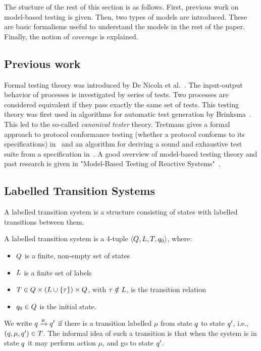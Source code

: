 The stucture of the rest of this section is as follows. First, previous work on model-based testing is given. Then, two types of models are introduced. These are basic formalisms useful to understand the models in the rest of the paper. Finally, the notion of \textit{coverage} is explained.

\subsection{Previous work}
Formal testing theory was introduced by De Nicola et al.~\cite{denicola:testing}. The input-output behavior of processes is investigated by series of tests. Two processes are considered equivalent if they pass exactly the same set of tests. This testing theory was first used in algorithms for automatic test generation by Brinksma~\cite{brinksma:testgeneration}. This led to the so-called \textit{canonical tester} theory. Tretmans gives a formal approach to protocol conformance testing (whether a protocol conforms to its specifications) in~\cite{Tretmans:conformancetesting} and an algorithm for deriving a sound and exhaustive test suite from a specification in~\cite{Tretmans:testgeneration}. A good overview of model-based testing theory and past research is given in "Model-Based Testing of Reactive Systems"~\cite{Broy:ModelBasedTesting}.

\subsection{Labelled Transition Systems}
A labelled transition system is a structure consisting of states with labelled transitions between them.
\vspace{5px}
\begin{definition}
A labelled transition system is a 4-tuple	$\langle Q, L, T, q_0\rangle$, where:
\begin{itemize}
\item $Q$  is a finite, non-empty set of states
\item $L$  is a finite set of labels
\item {} $T \in Q \times (L \cup \{\tau\}) \times Q$, with $\tau \notin L$, is the transition relation
\item {} $q_0 \in Q$ is the initial state.
\end{itemize}
We write $q \xrightarrow{\mu}q'$ if there is a transition labelled $\mu$ from state $q$ to state $q'$, i.e., $(q, \mu, q') \in T$. The informal idea of such a transition is that when the system is in state $q$ it may perform action $\mu$, and go to state $q'$. 
\end{definition}

